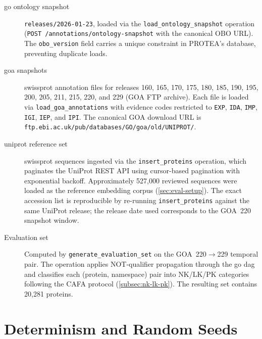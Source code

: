 \begin{description}
  \item[\gls{go} ontology snapshot] \texttt{releases/2026-01-23}, loaded
    via the \texttt{load\_ontology\_snapshot} operation
    (\texttt{POST /annotations/ontology-snapshot} with the canonical
    OBO URL). The \texttt{obo\_version} field carries a unique constraint
    in PROTEA's database, preventing duplicate loads.
  \item[\gls{goa} snapshots] \gls{swissprot} annotation files for
    releases 160, 165, 170, 175, 180, 185, 190, 195, 200, 205, 211,
    215, 220, and 229 (GOA FTP archive). Each file is loaded via
    \texttt{load\_goa\_annotations} with evidence codes restricted to
    \texttt{EXP}, \texttt{IDA}, \texttt{IMP}, \texttt{IGI},
    \texttt{IEP}, and \texttt{IPI}. The canonical GOA download URL is
    \texttt{ftp.ebi.ac.uk/pub/databases/GO/goa/old/UNIPROT/}.
  \item[\gls{uniprot} reference set] \gls{swissprot} sequences ingested
    via the \texttt{insert\_proteins} operation, which paginates the
    UniProt REST API using cursor-based pagination with exponential
    backoff. Approximately 527,000 reviewed sequences were loaded as
    the reference embedding corpus (\cref{sec:eval-setup}). The exact
    accession list is reproducible by re-running \texttt{insert\_proteins}
    against the same UniProt release; the release date used corresponds
    to the GOA~220 snapshot window.
  \item[Evaluation set] Computed by \texttt{generate\_evaluation\_set}
    on the GOA~220$\to$229 temporal pair. The operation applies NOT-qualifier
    propagation through the \gls{go} \gls{dag} and classifies each
    (protein, namespace) pair into NK/LK/PK categories following the
    CAFA protocol (\cref{subsec:nk-lk-pk}). The resulting set contains
    20,281 proteins.
\end{description}

\section{Determinism and Random Seeds}
\label{app:repro-seeds}

